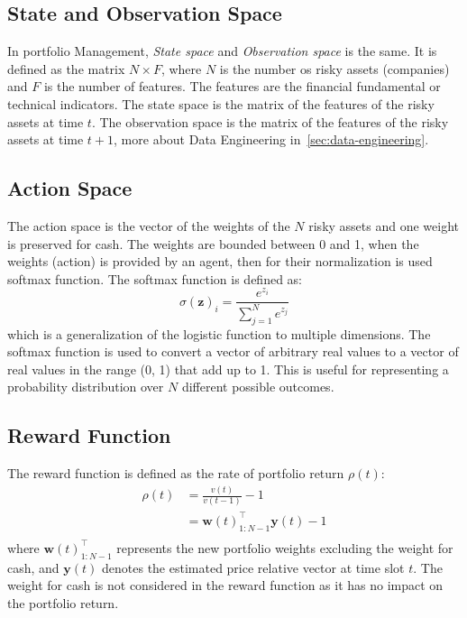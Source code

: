 \documentclass[../xlapes02]{subfiles}
\begin{document}
    \subsection{State and Observation Space}\label{subsec:state-space}
    In portfolio Management, \emph{State space} and \emph{Observation space} is the same. It is defined as the matrix $N\times F$, where $N$ is the number os risky assets (companies) and $F$ is the number of features. The features are the financial fundamental or technical indicators. The state space is the matrix of the features of the risky assets at time $t$. The observation space is the matrix of the features of the risky assets at time $t+1$, more about Data Engineering in~\cref{sec:data-engineering}.

    \subsection{Action Space}\label{subsec:action-space}
    The action space is the vector of the weights of the $N$ risky assets and one weight is preserved for cash. The weights are bounded between 0 and 1, when the weights (action) is provided by an agent, then for their normalization is used softmax function. The softmax function is defined as:
    \begin{equation}
        \sigma(\mathbf{z})_i=\frac{e^{z_i}}{\sum_{j=1}^{N}e^{z_j}}
    \end{equation}
    which is a generalization of the logistic function to multiple dimensions. The softmax function is used to convert a vector of arbitrary real values to a vector of real values in the range (0, 1) that add up to 1. This is useful for representing a probability distribution over $N$ different possible outcomes.

    \subsection{Reward Function}\label{subsec:reward-function}
    The reward function is defined as the rate of portfolio return $\rho(t)$:
    \begin{equation}
        \begin{split}
            \rho(t)&=\frac{v(t)}{v(t-1)}-1\\
            &=\mathbf{w}(t)_{1:N-1}^\top\mathbf{y}(t)-1\\
        \end{split}
    \end{equation}
    where $\mathbf{w}(t)_{1:N-1}^\top$ represents the new portfolio weights excluding the weight for cash, and $\mathbf{y}(t)$ denotes the estimated price relative vector at time slot $t$. The weight for cash is not considered in the reward function as it has no impact on the portfolio return.
\end{document}
